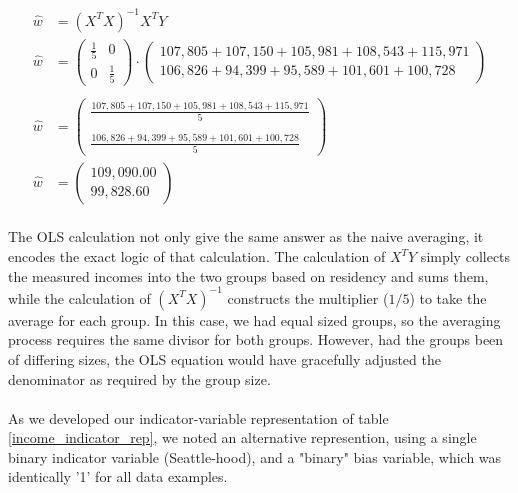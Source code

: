 \begin{align} 
\hat{w} &= (X^T X)^{-1} X^T Y 
\\
\hat{w} &= 
\left(\begin{array}{cc}
          \frac{1}{5} & 0 \\
          0           & \frac{1}{5} 
\end{array}\right)
\cdot
\left(\begin{array}{c}
         107,805 + 107,150 + 105,981 + 108,543 + 115,971 \\
         106,826 +  94,399 +  95,589 + 101,601 + 100,728 
\end{array}\right)
\\
\\
\hat{w} &= 
\left(\begin{array}{c}
         \displaystyle\frac{107,805 + 107,150 + 105,981 + 108,543 + 115,971}{5} \\
         \\
         \displaystyle\frac{106,826 +  94,399 +  95,589 + 101,601 + 100,728}{5} 
\end{array}\right)
\\
\hat{w} &= 
\left(\begin{array}{c}
          109,090.00 \\
          99,828.60
\end{array}\right)
\end{align}
\\
The OLS calculation not only give the same answer as the naive averaging, it
encodes the exact logic of that calculation.  The calculation of $X^T Y$ simply
collects the measured incomes into the two groups based on residency and sums
them, while the calculation of $(X^T X)^{-1}$ constructs the multiplier
($1/5$) to take the average for each group. In this case, we had equal sized
groups, so the averaging process requires the same divisor for both groups.
However, had the groups been of differing sizes, the OLS equation would
have gracefully adjusted the denominator as required by the group size.\\
\\
As we developed our indicator-variable representation of table 
\ref{income_indicator_rep}, we noted an alternative represention, using a single
binary indicator variable (Seattle-hood), and a "binary" bias variable, which
was identically '1' for all data examples.   








